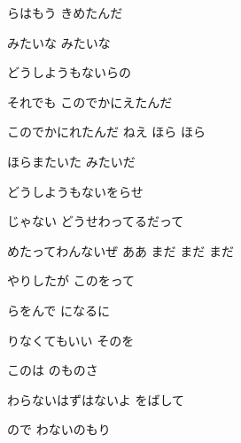 \documentclass[a4paper,tate,twocolumn,12pt]{ltjtarticle}
\begin{document}
\begin{flushleft}
\begin{minipage}{\linewidth}
らはもう きめたんだ
\end{minipage}

\vspace{2em}

\noindent\begin{minipage}{\linewidth}
みたいな みたいな

どうしようもないらの

それでも このでかにえたんだ

このでかにれたんだ ねえ ほら ほら
\end{minipage}

\vspace{2em}

\noindent\begin{minipage}{\linewidth}
ほらまたいた みたいだ

どうしようもないをらせ

じゃない どうせわってるだって

めたってわんないぜ ああ まだ まだ まだ
\end{minipage}

\vspace{2em}

\noindent\begin{minipage}{\linewidth}
やりしたが このをって

らをんで になるに

りなくてもいい そのを

このは のものさ
\end{minipage}

\vspace{2em}

\noindent\begin{minipage}{\linewidth}
わらないはずはないよ をばして
\end{minipage}

\vspace{2em}

\noindent\begin{minipage}{\linewidth}
ので わないのもり


\end{minipage}
\end{flushleft}
\end{document}
